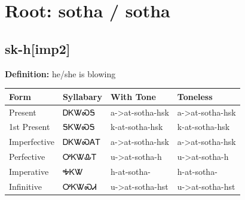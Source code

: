\documentclass{article}%
\begin{document}
%
\normalsize%
\section*{Root: sotha / sotha}%
\subsection*{sk-h[imp2]}%
\textbf{Definition: }%
he/she is blowing%
\\[0.5em]%
\begin{tabular}{|l|l|l|l|}%
\hline%
\textbf{Form}&\textbf{Syllabary}&\textbf{With Tone}&\textbf{Toneless}\\%
\hline%
Present&ᎠᏦᏔᏍᎦ&a{-}>at{-}sotha{-}hsk&a{-}>at{-}sotha{-}hsk\\%
1st Present&ᎦᏦᏔᏍᎦ&k{-}at{-}sotha{-}hsk&k{-}at{-}sotha{-}hsk\\%
Imperfective&ᎠᏦᏔᏍᎪᎢ&a{-}>at{-}sotha{-}hsk&a{-}>at{-}sotha{-}hsk\\%
Perfective&ᎤᏦᏔᎲᎢ&u{-}>at{-}sotha{-}h&u{-}>at{-}sotha{-}h\\%
Imperative&ᎭᏦᏔ&h{-}at{-}sotha{-}&h{-}at{-}sotha{-}\\%
Infinitive&ᎤᏦᏔᏍᏗ&u{-}>at{-}sotha{-}hst&u{-}>at{-}sotha{-}hst\\%
\hline%
\end{tabular}%
\\[1em]%
\end{document}
